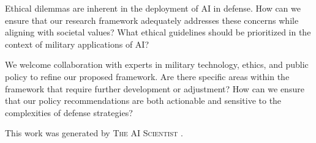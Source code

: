 \documentclass{article} %
\begin{document}
Ethical dilemmas are inherent in the deployment of AI in defense. How can we ensure that our research framework adequately addresses these concerns while aligning with societal values? What ethical guidelines should be prioritized in the context of military applications of AI?

We welcome collaboration with experts in military technology, ethics, and public policy to refine our proposed framework. Are there specific areas within the framework that require further development or adjustment? How can we ensure that our policy recommendations are both actionable and sensitive to the complexities of defense strategies?

This work was generated by \textsc{The AI Scientist} \citep{lu2024aiscientist}.



\end{document}
